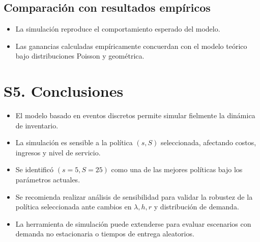 \documentclass{report}
\begin{document}
\subsection*{Comparación con resultados empíricos}

\begin{itemize}
\item La simulación reproduce el comportamiento esperado del modelo.
\item Las ganancias calculadas empíricamente concuerdan con el modelo teórico bajo distribuciones Poisson y geométrica.
\end{itemize}


\section*{S5. Conclusiones}

\begin{itemize}
\item El modelo basado en eventos discretos permite simular fielmente la dinámica de inventario.
\item La simulación es sensible a la política \((s, S)\) seleccionada, afectando costos, ingresos y nivel de servicio.
\item Se identificó \((s=5, S=25)\) como una de las mejores políticas bajo los parámetros actuales.
\item Se recomienda realizar análisis de sensibilidad para validar la robustez de la política seleccionada ante cambios en \(\lambda, h, r\) y distribución de demanda.
\item La herramienta de simulación puede extenderse para evaluar escenarios con demanda no estacionaria o tiempos de entrega aleatorios.
\end{itemize}
\end{document}
